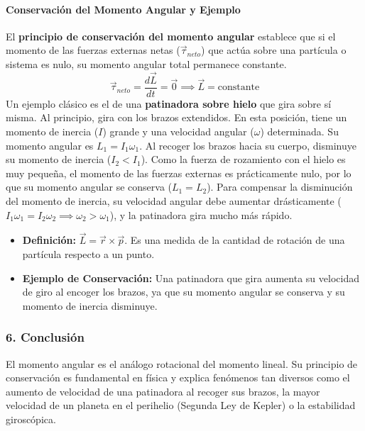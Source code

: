 \paragraph*{Conservación del Momento Angular y Ejemplo}
El \textbf{principio de conservación del momento angular} establece que si el momento de las fuerzas externas netas ($\vec{\tau}_{neto}$) que actúa sobre una partícula o sistema es nulo, su momento angular total permanece constante.
$$ \vec{\tau}_{neto} = \frac{d\vec{L}}{dt} = \vec{0} \implies \vec{L} = \text{constante} $$
Un ejemplo clásico es el de una \textbf{patinadora sobre hielo} que gira sobre sí misma. Al principio, gira con los brazos extendidos. En esta posición, tiene un momento de inercia ($I$) grande y una velocidad angular ($\omega$) determinada. Su momento angular es $L_1 = I_1 \omega_1$. Al recoger los brazos hacia su cuerpo, disminuye su momento de inercia ($I_2 < I_1$). Como la fuerza de rozamiento con el hielo es muy pequeña, el momento de las fuerzas externas es prácticamente nulo, por lo que su momento angular se conserva ($L_1 = L_2$). Para compensar la disminución del momento de inercia, su velocidad angular debe aumentar drásticamente ($I_1 \omega_1 = I_2 \omega_2 \implies \omega_2 > \omega_1$), y la patinadora gira mucho más rápido.

\begin{cajaresultado}
\begin{itemize}
    \item \textbf{Definición:} $\vec{L} = \vec{r} \times \vec{p}$. Es una medida de la cantidad de rotación de una partícula respecto a un punto.
    \item \textbf{Ejemplo de Conservación:} Una patinadora que gira aumenta su velocidad de giro al encoger los brazos, ya que su momento angular se conserva y su momento de inercia disminuye.
\end{itemize}
\end{cajaresultado}

\subsubsection*{6. Conclusión}
\begin{cajaconclusion}
El momento angular es el análogo rotacional del momento lineal. Su principio de conservación es fundamental en física y explica fenómenos tan diversos como el aumento de velocidad de una patinadora al recoger sus brazos, la mayor velocidad de un planeta en el perihelio (Segunda Ley de Kepler) o la estabilidad giroscópica.
\end{cajaconclusion}

